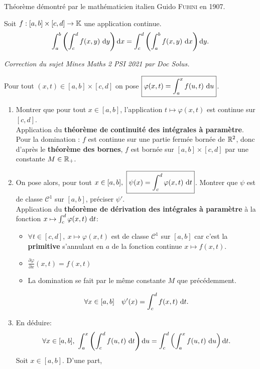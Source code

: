 Théorème démontré par le mathématicien italien Guido \textsc{Fubini} en 1907.
\begin{tcolorbox}
    Soit $f: [a,b] \times [c, d] \to \mathbb{K}$ une application continue.
    $$\int_{a}^{b} \left ( \int_{c}^{d} f(x,y)\ \mathrm{d} y \right) \mathrm{d} x = \int_{c}^{d} \left ( \int_{a}^{b} f(x,y)\ \mathrm{d} x \right) \mathrm{d} y.$$
\end{tcolorbox}

\textit{Correction du sujet Mines Maths 2 PSI 2021 par Doc Solus.} 
\begin{preuve}
    Pour tout $(x, t) \in [a, b] \times [c, d]$ on pose $\boxed{\varphi(x, t) = \int_{a}^{x} f(u, t)\ \mathrm{d} u}$. 
    \begin{enumerate}
        \item Montrer que pour tout $x \in [a, b]$, l'application $t \mapsto \varphi(x, t)$ est continue sur $[c, d]$. \\
        Application du \textbf{théorème de continuité des intégrales à paramètre}. \\
        Pour la domination : $f$ est continue sur une partie fermée bornée de $\mathbb{R}^2$, donc d'après le \textbf{théorème des bornes}, $f$ est bornée sur $[a, b] \times [c, d]$ par une constante $M \in \mathbb{R}_+$.
        \item On pose alors, pour tout $x  \in [a, b],\ \boxed{\psi(x) = \int_{c}^{d} \varphi(x, t)\ \mathrm{d} t}$. Montrer que $\psi$ est de classe $\mathscr{C}^1$ sur $[a, b]$, préciser $\psi'$. \\
        Application du \textbf{théorème de dérivation des intégrales à paramètre} à la fonction $x \mapsto \int_{c}^{d} \varphi(x, t)\ \mathrm{d} t$:
        \begin{itemize}
            \item $\forall t \in [c, d],\ x \mapsto \varphi(x, t)$ est de classe $\mathscr{C}^1$ sur $[a, b]$ car c'est la \textbf{primitive} s'annulant en $a$ de la fonction continue $x \mapsto f(x, t)$. 
            \item $\frac{\partial \varphi}{\partial x}(x, t) = f(x, t)$
            \item La domination se fait par le même constante $M$ que précédemment. 
        \end{itemize}
        $$\forall x \in [a, b] \quad \psi'(x) = \int_{c}^{d} f(x, t)\ \mathrm{d} t.$$
        \item En déduire:
        $$\forall x \in [a, b],\ \int_{a}^{x} \left ( \int_{c}^{d} f(u,t)\ \d t \right) \d u = \int_{c}^{d} \left ( \int_{a}^{x} f(u,t)\ \d u \right) \d t.$$
        Soit $x \in [a, b]$. D'une part,

\end{enumerate}
\end{preuve}
